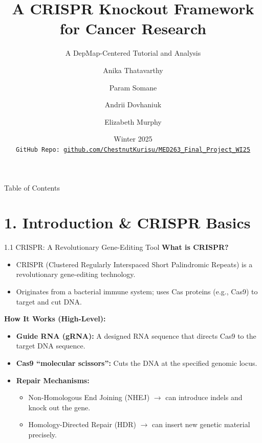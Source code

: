 \documentclass[10pt]{beamer}
\title[CRISPR Knockout Framework for Cancer Research]{A CRISPR Knockout Framework for Cancer Research}
\subtitle{A DepMap-Centered Tutorial and Analysis}
\author[Group 3]{%
  Anika Thatavarthy \and Param Somane \and Andrii Dovhaniuk \and Elizabeth Murphy
}
\institute[UCSD MED 263]{%
  Department of Medicine\\
  University of California, San Diego
}
\date[Winter 2025]{%
  Winter 2025\\
  \texttt{GitHub Repo: \href{https://github.com/ChestnutKurisu/MED263_Final_Project_WI25}{github.com/ChestnutKurisu/MED263\_Final\_Project\_WI25}}
}
\begin{document}
\begin{frame}
  \titlepage
\end{frame}

\begin{frame}{Table of Contents}
  \tableofcontents
\end{frame}

\section{1. Introduction \& CRISPR Basics}

\begin{frame}{1.1 CRISPR: A Revolutionary Gene-Editing Tool}
  \textbf{What is CRISPR?}
  \begin{itemize}
    \item CRISPR (Clustered Regularly Interspaced Short Palindromic Repeats) is a revolutionary gene-editing technology.
    \item Originates from a bacterial immune system; uses Cas proteins (e.g., Cas9) to target and cut DNA.
  \end{itemize}
  
  \vspace{0.4cm}
  \textbf{How It Works (High-Level):}
  \begin{itemize}
    \item \textbf{Guide RNA (gRNA):} A designed RNA sequence that directs Cas9 to the target DNA sequence.
    \item \textbf{Cas9 “molecular scissors”:} Cuts the DNA at the specified genomic locus.
    \item \textbf{Repair Mechanisms:}
      \begin{itemize}
        \item Non-Homologous End Joining (NHEJ) \(\to\) can introduce indels and knock out the gene.
        \item Homology-Directed Repair (HDR) \(\to\) can insert new genetic material precisely.
      \end{itemize}
  \end{itemize}
\end{frame}
\end{document}
